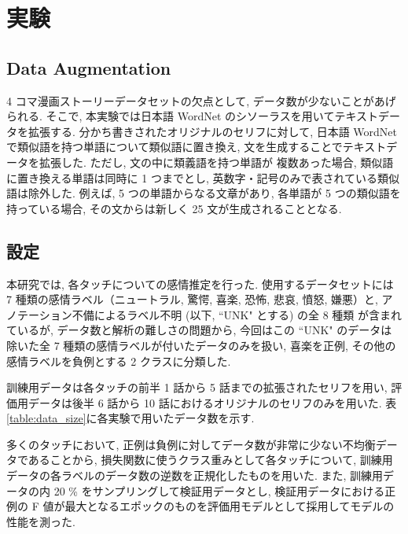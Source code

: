 \documentclass[twocolumn]{jarticle}     %
\begin{document}
\section{実験}
\subsection{Data Augmentation}
4 コマ漫画ストーリーデータセットの欠点として, データ数が少ないことがあげられる. そこで, 本実験では日本語 WordNet \cite{word_net_jp} のシソーラスを用いてテキストデータを拡張する.
分かち書きされたオリジナルのセリフに対して, 日本語 WordNet で類似語を持つ単語について類似語に置き換え, 文を生成することでテキストデータを拡張した. ただし, 文の中に類義語を持つ単語が
複数あった場合, 類似語に置き換える単語は同時に 1 つまでとし, 英数字・記号のみで表されている類似語は除外した. 例えば, 5 つの単語からなる文章があり,
各単語が 5 つの類似語を持っている場合, その文からは新しく 25 文が生成されることとなる.

\subsection{設定}
本研究では, 各タッチについての感情推定を行った.
使用するデータセットには 7 種類の感情ラベル（ニュートラル, 驚愕, 喜楽, 恐怖, 悲哀, 憤怒, 嫌悪）と, アノテーション不備によるラベル不明 (以下, ``UNK" とする) の全 8 種類
が含まれているが, データ数と解析の難しさの問題から, 今回はこの ``UNK" のデータは除いた全 7 種類の感情ラベルが付いたデータのみを扱い, 喜楽を正例, その他の感情ラベルを負例とする 2 クラスに分類した.

訓練用データは各タッチの前半 1 話から 5 話までの拡張されたセリフを用い,
評価用データは後半 6 話から 10 話におけるオリジナルのセリフのみを用いた.
表\ref{table:data_size}に各実験で用いたデータ数を示す.

多くのタッチにおいて, 正例は負例に対してデータ数が非常に少ない不均衡データであることから, 損失関数に使うクラス重みとして各タッチについて, 訓練用データの各ラベルのデータ数の逆数を正規化したものを用いた. また, 訓練用データの内 20 \% をサンプリングして検証用データとし, 検証用データにおける正例の F 値が最大となるエポックのものを評価用モデルとして採用してモデルの性能を測った.
\end{document}
